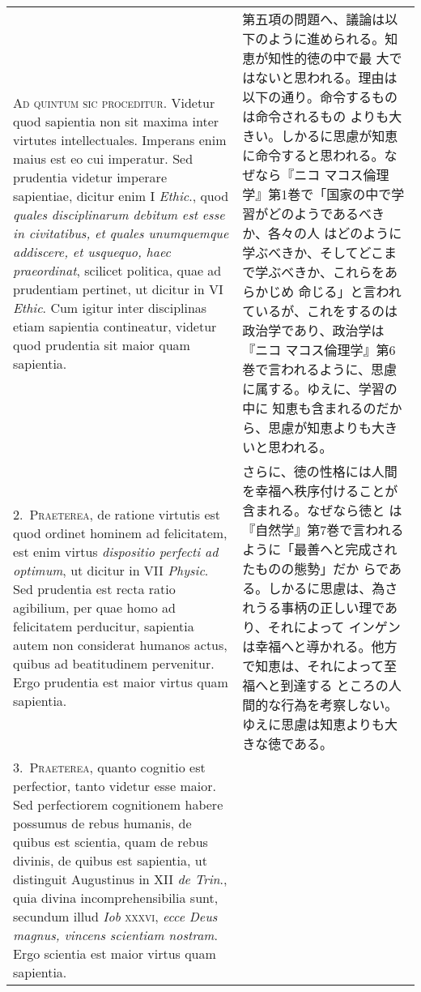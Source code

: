 \documentclass[10pt]{jsarticle}
\begin{document}
\begin{longtable}{p{21em}p{21em}}
{\scshape Ad quintum sic proceditur}. Videtur quod sapientia non sit
maxima inter virtutes intellectuales. Imperans enim maius est eo cui
imperatur. Sed prudentia videtur imperare sapientiae, dicitur enim I
{\itshape Ethic}., quod {\itshape quales disciplinarum debitum est
esse in civitatibus, et quales unumquemque addiscere, et usquequo,
haec praeordinat}, scilicet politica, quae ad prudentiam pertinet, ut
dicitur in VI {\itshape Ethic}. Cum igitur inter disciplinas etiam
sapientia contineatur, videtur quod prudentia sit maior quam
sapientia.


&

 第五項の問題へ、議論は以下のように進められる。知恵が知性的徳の中で最
 大ではないと思われる。理由は以下の通り。命令するものは命令されるもの
 よりも大きい。しかるに思慮が知恵に命令すると思われる。なぜなら『ニコ
 マコス倫理学』第1巻で「国家の中で学習がどのようであるべきか、各々の人
 はどのように学ぶべきか、そしてどこまで学ぶべきか、これらをあらかじめ
 命じる」と言われているが、これをするのは政治学であり、政治学は『ニコ
 マコス倫理学』第6巻で言われるように、思慮に属する。ゆえに、学習の中に
 知恵も含まれるのだから、思慮が知恵よりも大きいと思われる。

\\




2.~{\scshape Praeterea}, de ratione virtutis est quod ordinet hominem
ad felicitatem, est enim virtus {\itshape dispositio perfecti ad
optimum}, ut dicitur in VII {\itshape Physic}. Sed prudentia est recta
ratio agibilium, per quae homo ad felicitatem perducitur, sapientia
autem non considerat humanos actus, quibus ad beatitudinem
pervenitur. Ergo prudentia est maior virtus quam sapientia.


&

さらに、徳の性格には人間を幸福へ秩序付けることが含まれる。なぜなら徳と
は『自然学』第7巻で言われるように「最善へと完成されたものの態勢」だか
らである。しかるに思慮は、為されうる事柄の正しい理であり、それによって
インゲンは幸福へと導かれる。他方で知恵は、それによって至福へと到達する
ところの人間的な行為を考察しない。ゆえに思慮は知恵よりも大きな徳である。
 
\\

3.~{\scshape Praeterea}, quanto cognitio est perfectior, tanto videtur
esse maior. Sed perfectiorem cognitionem habere possumus de rebus
humanis, de quibus est scientia, quam de rebus divinis, de quibus est
sapientia, ut distinguit Augustinus in XII {\itshape de Trin}., quia
divina incomprehensibilia sunt, secundum illud {\itshape Iob}
{\scshape xxxvi}, {\itshape ecce Deus magnus, vincens scientiam
nostram}. Ergo scientia est maior virtus quam sapientia.



\end{longtable}
\end{document}
